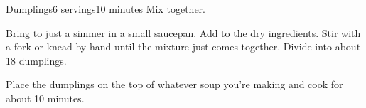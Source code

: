 \documentclass[../Cookbook.tex]{subfiles}
\begin{document}
\begin{recipe}[Dumplings]{Dumplings}{6 servings}{10 minutes}
    Mix together.

    Bring to just a simmer in a small saucepan.
    Add to the dry ingredients.
    Stir with a fork or knead by hand until the mixture just comes together.
    Divide into about 18 dumplings.

    Place the dumplings on the top of whatever soup you're making and cook for about 10 minutes.
\end{recipe}
\end{document}

